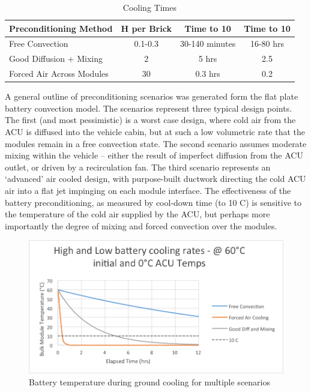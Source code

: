 \documentclass[]{aiaa-tc}%
\begin{document}
\begin{table}[ht]
\begin{center}
\begin{tabular}{|l|c|c|c|}
\hline
 \multicolumn{1}{|c|}{\textbf{Preconditioning Method}} &
\multicolumn{1}{c|}{\textbf{H per Brick}} & 
\multicolumn{1}{c|}{\textbf{Time to 10}} &
\multicolumn{1}{c|}{\textbf{Time to 10}} \\ 
\hline
\rowcolor{LightCyan}
Free Convection  & 0.1-0.3  & 30-140 minutes & 16-80 hrs \\
Good Diffusion + Mixing   & 2 & 5 hrs & 2.5 \\
\rowcolor{LightCyan}
Forced Air Across Modules  & 30 & 0.3 hrs & 0.2\\
\hline
\end{tabular}
\end{center}
\label{tab:batt}
\caption{Cooling Times}
\end{table}

A general outline of preconditioning scenarios was generated form the flat plate battery convection model.  The scenarios represent three typical design points.  The first (and most pessimistic) is a worst case design, where cold air from the ACU is diffused into the vehicle cabin, but at such a low volumetric rate that the modules remain in a free convection state.  The second scenario assumes moderate mixing within the vehicle – either the result of imperfect diffusion from the ACU outlet, or driven by a recirculation fan.  The third scenario represents an ‘advanced’ air cooled design, with purpose-built ductwork directing the cold ACU air into a flat jet impinging on each module interface.  
The effectiveness of the battery preconditioning, as measured by cool-down time (to 10 C) is sensitive to the temperature of the cold air supplied by the ACU, but perhaps more importantly the degree of mixing and forced convection over the modules. 


\begin{figure}[!htb]%
	\centering
	\includegraphics[width=1.0\textwidth]{figures/batt_cooling.png}
	\caption{Battery temperature during ground cooling for multiple scenarios}
	\label{fig:coolingTime}
\end{figure}
\end{document}
